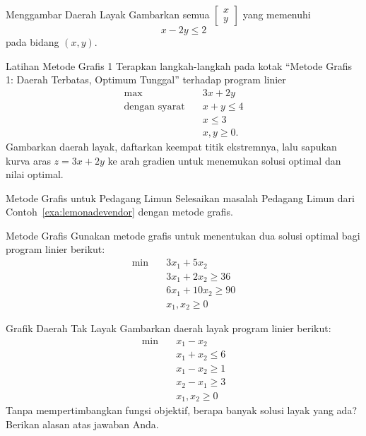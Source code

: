 \begin{ex}{Menggambar Daerah Layak}{}\label{ex:feasible-region}
Gambarkan semua \(\begin{bmatrix} x \\ y \end{bmatrix}\) yang memenuhi
\[
x - 2y \leq 2
\]
pada bidang \((x,y)\).
\exrefs{\S\ref{sec:nonempty-bounded}}
\end{ex}

\begin{ex}{Latihan Metode Grafis 1}{}\label{ex:graphical-method-one}
Terapkan langkah-langkah pada kotak ``Metode Grafis 1: Daerah Terbatas, Optimum Tunggal'' terhadap program linier
\begin{align*}
\max \quad & 3x + 2y\\
\text{dengan syarat} \quad & x + y \leq 4\\
& x \leq 3\\
& x, y \geq 0.
\end{align*}
Gambarkan daerah layak, daftarkan keempat titik ekstremnya, lalu sapukan kurva aras $z = 3x + 2y$ ke arah gradien untuk menemukan solusi optimal dan nilai optimal.
\end{ex}

\begin{ex}{Metode Grafis untuk Pedagang Limun}{}
Selesaikan masalah Pedagang Limun dari Contoh~\ref{exa:lemonadevendor} dengan metode grafis.
\end{ex}


\begin{ex}{Metode Grafis}{}
Gunakan metode grafis untuk menentukan dua solusi optimal bagi program linier berikut:
\begin{align*}
\min  \quad& 3x_1 + 5x_2\\
 & 3x_1 + 2x_2 \ge 36\\
 & 6x_1 + 10x_2 \geq 90\\
 & x_1, x_2 \geq 0
\end{align*}
\end{ex}

\begin{ex}{Grafik Daerah Tak Layak}{}\label{ex:infeasible}
Gambarkan daerah layak program linier berikut:
\begin{align*}
\min  \quad & x_1 - x_2\\
 & x_1 + x_2 \leq 6\\
 & x_1 - x_2 \geq 1\\
 & x_2 - x_1 \geq 3\\
 & x_1, x_2 \geq 0
\end{align*}
Tanpa mempertimbangkan fungsi objektif, berapa banyak solusi layak yang ada? Berikan alasan atas jawaban Anda.
\end{ex}


